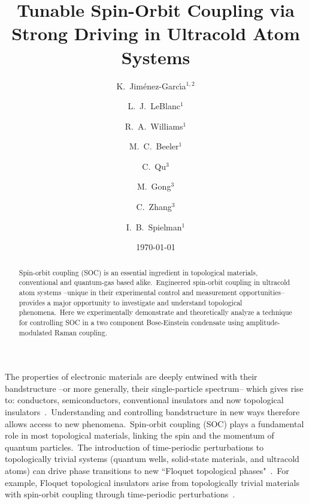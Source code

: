 \documentclass[twocolumn,amsmath,amssymb,floatfix,prl]{revtex4-1}
\begin{document}
\title{Tunable Spin-Orbit Coupling via Strong Driving in Ultracold Atom Systems}

\author{K.~Jim\'{e}nez-Garc\'{\i}a$^{1,2}$}
\author{L.~J.~LeBlanc$^1$}
\author{R.~A.~Williams$^1$}
\author{M.~C.~Beeler$^1$}
\author{C.~Qu$^3$}
\author{M.~Gong$^3$}
\author{C.~Zhang$^3$}
\author{I.~B.~Spielman$^1$}

\date{\today}

\begin{abstract}
Spin-orbit coupling (SOC) is an essential ingredient in topological materials, conventional and quantum-gas based alike.~Engineered spin-orbit coupling in ultracold atom systems --unique in their experimental control and measurement opportunities-- provides a major opportunity to investigate and understand topological phenomena.~Here we experimentally demonstrate and theoretically analyze a technique for controlling SOC in a two component Bose-Einstein condensate using amplitude-modulated Raman coupling.
\end{abstract}
\maketitle

The properties of electronic materials are deeply entwined with their bandstructure --or more generally, their single-particle spectrum-- which gives rise to: conductors, semiconductors, conventional insulators and now topological insulators~\cite{Hasan2010}.~Understanding and controlling bandstructure in new ways therefore allows access to new phenomena.~Spin-orbit coupling (SOC) plays a fundamental role in most topological materials, linking the spin and the momentum of quantum particles.~The introduction of time-periodic perturbations to topologically trivial systems (quantum wells, solid-state materials, and ultracold atoms) can drive phase transitions to new ``Floquet topological phases"~\cite{Linder2011,Jotzu2014}.~For example, Floquet topological insulators arise from topologically trivial materials with spin-orbit coupling through time-periodic perturbations~\cite{Linder2011}.
\end{document}
